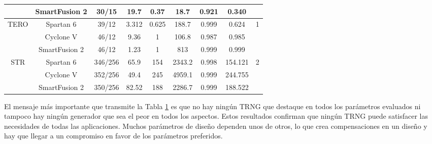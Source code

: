 \begin{table}[htbp]
{\begin{tabular}{|c|c|c|c|c|c|c|c|c|}
                                  & SmartFusion 2 & 30/15 & 19.7  & 0.37  & 18.7  & 0.921 & 0.340 &  \\
                            \hline
                            \multirow{3}[2]{*}{TERO} & Spartan 6 & 39/12 & 3.312 & 0.625 & 188.7 & 0.999 & 0.624 & \multirow{3}[2]{*}{1} \\
                                  & Cyclone V & 46/12 & 9.36  & 1     & 106.8 & 0.987 & 0.985 &  \\
                                  & SmartFusion 2 & 46/12 & 1.23  & 1     & 813   & 0.999 & 0.999 &  \\
                            \hline
                            \multirow{3}[2]{*}{STR} & Spartan 6 & 346/256 & 65.9  & 154   & 2343.2 & 0.998 & 154.121 & \multirow{3}[2]{*}{2} \\
                                  & Cyclone V & 352/256 & 49.4  & 245   & 4959.1 & 0.999 & 244.755 &  \\
                                  & SmartFusion 2 & 350/256 & 82.52 & 188   & 2286.7 & 0.999 & 188.522 &  \\
                            \hline
                        \end{tabular}%
                    }
                  \label{tab:resumen_de_trng_cores}
                \end{table}%

                El mensaje más importante que transmite la Tabla \ref{tab:resumen_de_trng_cores} es que no hay ningún TRNG que destaque en todos los parámetros evaluados ni tampoco hay ningún generador que sea el peor en todos los aspectos. Estos resultados confirman que ningún TRNG puede satisfacer las necesidades de todas las aplicaciones. Muchos parámetros de diseño dependen unos de otros, lo que crea compensaciones en un diseño y hay que llegar a un compromiso en favor de los parámetros preferidos.

